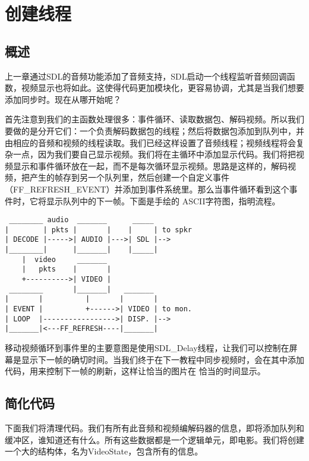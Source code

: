 ﻿\chapter{创建线程}
\label{ch4}
\section{概述}

上一章通过SDL的音频功能添加了音频支持，SDL启动一个线程监听音频回调函数，视频显示也将如此。这使得代码更加模块化，更容易协调，尤其是当我们想要添加同步时。现在从哪开始呢？

首先注意到我们的主函数处理很多：事件循环、读取数据包、解码视频。所以我们要做的是分开它们：一个负责解码数据包的线程；然后将数据包添加到队列中，并由相应的音频和视频的线程读取。我们已经这样设置了音频线程；视频线程将会复杂一点，因为我们要自己显示视频。我们将在主循环中添加显示代码。我们将把视频显示和事件循环放在一起，而不是每次循环显示视频。思路是这样的，解码视频，把产生的帧存到另一个队列里，然后创建一个自定义事件 （FF_REFRESH_EVENT）并添加到事件系统里。那么当事件循环看到这个事件时，它将显示队列中的下一帧。下面是手绘的 ASCII字符图，指明流程。


\begin{verbatim}
 ________ audio  _______      _____
|        | pkts |       |    |     | to spkr
| DECODE |----->| AUDIO |--->| SDL |-->
|________|      |_______|    |_____|
    |  video     _______
    |   pkts    |       |
    +---------->| VIDEO |
 ________       |_______|   _______
|       |          |       |       |
| EVENT |          +------>| VIDEO | to mon.
| LOOP  |----------------->| DISP. |-->
|_______|<---FF_REFRESH----|_______|
\end{verbatim}

移动视频循环到事件里的主要意图是使用SDL_Delay线程，让我们可以控制在屏幕是显示下一帧的确切时间。当我们终于在下一教程中同步视频时，会在其中添加代码，用来控制下一帧的刷新，这样让恰当的图片在
恰当的时间显示。

\section{简化代码}

下面我们将清理代码。我们有所有此音频和视频编解码器的信息，即将添加队列和缓冲区，谁知道还有什么。所有这些数据都是一个逻辑单元，即电影。我们将创建一个大的结构体，名为VideoState，包含所有的信息。


